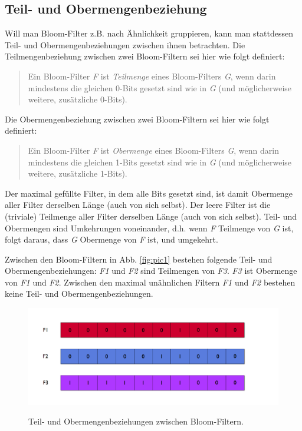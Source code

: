 \subsection{Teil- und Obermengenbeziehung}\label{sec:mengenbeziehungen}
Will man Bloom-Filter z.B. nach Ähnlichkeit gruppieren, kann man stattdessen Teil- und Obermengenbeziehungen zwischen ihnen betrachten. Die Teilmengenbeziehung zwischen zwei Bloom-Filtern sei hier wie folgt definiert: 
\begin{quote}
Ein Bloom-Filter \textit{F} ist \textit{Teilmenge} eines Bloom-Filters \textit{G}, wenn darin mindestens die gleichen 0-Bits gesetzt sind wie in \textit{G} (und möglicherweise weitere, zusätzliche 0-Bits).
\end{quote}
Die Obermengenbeziehung zwischen zwei Bloom-Filtern sei hier wie folgt definiert: 
\begin{quote}
Ein Bloom-Filter \textit{F} ist \textit{Obermenge} eines Bloom-Filters \textit{G}, wenn darin mindestens die gleichen 1-Bits gesetzt sind wie in \textit{G} (und möglicherweise weitere, zusätzliche 1-Bits).
\end{quote}
Der maximal gefüllte Filter, in dem alle Bits gesetzt sind, ist damit Obermenge aller Filter derselben Länge (auch von sich selbst). Der leere Filter ist die (triviale) Teilmenge aller Filter derselben Länge (auch von sich selbst). Teil- und Obermengen sind Umkehrungen voneinander, d.h. wenn \textit{F} Teilmenge von \textit{G} ist, folgt daraus, dass \textit{G} Obermenge von \textit{F} ist, und umgekehrt.  

Zwischen den Bloom-Filtern in Abb. \ref{fig:pic1} bestehen folgende Teil- und Obermengenbeziehungen: \textit{F1} und \textit{F2} sind Teilmengen von \textit{F3}. \textit{F3} ist Obermenge von \textit{F1} und \textit{F2}. Zwischen den maximal unähnlichen Filtern \textit{F1} und \textit{F2} bestehen keine Teil- und Obermengenbeziehungen. 
\begin{figure}[hpbt]
  \centering
  \includegraphics[width=1.0\textwidth]{pictures/distances.png}\\
  \caption[Teil- und Obermengenbeziehungen zwischen Bloom-Filtern]{Teil- und Obermengenbeziehungen zwischen Bloom-Filtern.}\label{fig:pic2}
\end{figure}

